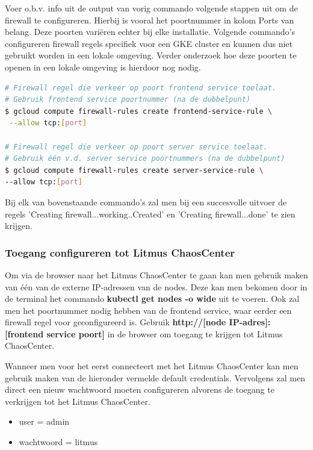 Voer o.b.v. info uit de output van vorig commando volgende stappen uit om de firewall te configureren. Hierbij is vooral het poortnummer in kolom Ports van belang. Deze poorten variëren echter bij elke installatie. Volgende commando's configureren firewall regels specifiek voor een GKE cluster en kunnen dus niet gebruikt worden in een lokale omgeving. Verder onderzoek hoe deze poorten te openen in een lokale omgeving is hierdoor nog nodig.  
\begin{lstlisting}[language=bash]
# Firewall regel die verkeer op poort frontend service toelaat.
# Gebruik frontend service poortnummer (na de dubbelpunt) 
$ gcloud compute firewall-rules create frontend-service-rule \
 --allow tcp:[port]

# Firewall regel die verkeer op poort server service toelaat. 
# Gebruik één v.d. server service poortnummers (na de dubbelpunt) 
$ gcloud compute firewall-rules create server-service-rule \
--allow tcp:[port]
\end{lstlisting}

Bij elk van bovenstaande commando's zal men bij een succesvolle uitvoer de regels 'Creating firewall...working..Created' en 'Creating firewall...done' te zien krijgen. 

\subsubsection{Toegang configureren tot Litmus ChaosCenter}
\label{subsec:chaoscenter}

Om via de browser naar het Litmus ChaosCenter te gaan kan men gebruik maken van één van de externe IP-adressen van de nodes. Deze kan men bekomen door in de terminal het commando {\bf kubectl get nodes -o wide} uit te voeren. Ook zal men het poortnummer nodig hebben van de frontend service, waar eerder een firewall regel voor geconfigureerd is. Gebruik {\bf http://[node IP-adres]:[frontend service poort]} in de browser om toegang te krijgen tot Litmus ChaosCenter. 

Wanneer men voor het eerst connecteert met het Litmus ChaosCenter kan men gebruik maken van de hieronder vermelde default credentials. Vervolgens zal men direct een nieuw wachtwoord moeten configureren alvorens de toegang te verkrijgen tot het Litmus ChaosCenter.
\begin{itemize}
    \item user = admin
    \item wachtwoord = litmus
\end{itemize}

